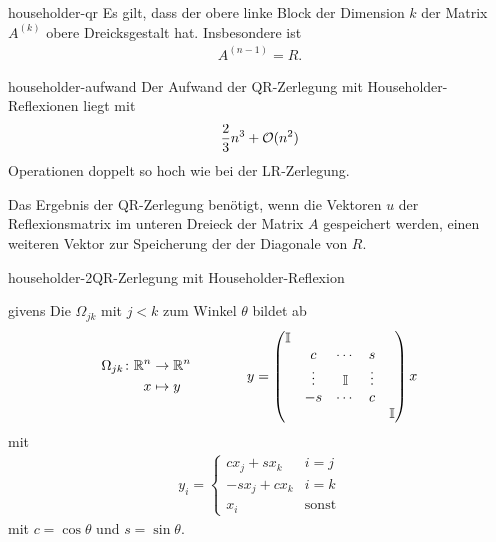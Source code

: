 \begin{Lemma}{householder-qr}
  Es gilt, dass der obere linke Block der Dimension $k$ der Matrix
  $A^{(k)}$ obere Dreicksgestalt hat. Insbesondere ist
  \begin{gather}
    A^{(n-1)} = R.
  \end{gather}
\end{Lemma}

\begin{Lemma}{householder-aufwand}
  Der Aufwand der QR-Zerlegung mit Householder-Reflexionen liegt mit
  \begin{gather}
    \frac23 n^3 + \mathcal O(n^2)
  \end{gather}
  Operationen doppelt so hoch wie bei der LR-Zerlegung.

  Das Ergebnis der QR-Zerlegung benötigt, wenn die Vektoren $u$ der
  Reflexionsmatrix im unteren Dreieck der Matrix $A$ gespeichert
  werden, einen weiteren Vektor zur Speicherung der der Diagonale von
  $R$.
\end{Lemma}

\begin{Algorithmus*}{householder-2}{QR-Zerlegung mit Householder-Reflexion}
  
\end{Algorithmus*}


\begin{Definition}{givens}
  Die  $\Omega_{jk}$ mit $j<k$ zum Winkel $\theta$ bildet ab
  \begin{gather}
    \label{eq:qr:givens-1}
    \begin{aligned}
      \Omega_{jk}\colon \mathbb R^n &\to \mathbb R^n\\
      x & \mapsto y      
    \end{aligned}
    \qquad\qquad
    y =
    \begin{pmatrix}
      \mathbb I \\
      &c&\cdots&s\\
      &\vdots&\mathbb I &\vdots\\
      &-s&\cdots&c\\
      &&&&\mathbb I
    \end{pmatrix}
    x
  \end{gather}
  mit
  \begin{gather}
    y_i =
    \begin{cases}
      c x_j + s x_k & i=j\\
      -s x_j + c x_k & i=k\\
      x_i &\text{sonst}
    \end{cases}
  \end{gather}
  mit $c = \cos\theta$ und $s = \sin\theta$.
\end{Definition}

